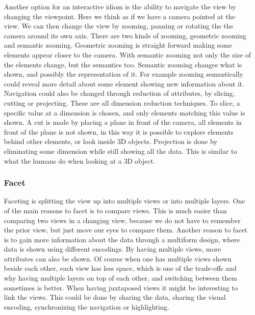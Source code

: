 \documentclass[Report.tex]{subfiles}
\begin{document}
Another option for an interactive idiom is the ability to navigate the view by changing the viewpoint. Here we think as if we have a camera pointed at the view. We can then change the view by zooming, panning or rotating the the camera around its own axis. There are two kinds of zooming, geometric zooming and semantic zooming. Geometric zooming is straight forward making some elements appear closer to the camera. With semantic zooming not only the size of the elements change, but the semantics too. Semantic zooming changes what is shown, and possibly the representation of it. For example zooming semantically could reveal more detail about some element showing new information about it.
Navigation could also be changed through reduction of attributes, by slicing, cutting or projecting. These are all dimension reduction techniques. To slice, a specific value at a dimension is chosen, and only elements matching this value is shown. A cut is made by placing a plane in front of the camera, all elements in front of the plane is not shown, in this way it is possible to explore elements behind other elements, or look inside 3D objects. Projection is done by eliminating some dimension while still showing all the data. This is similar to what the humans do when looking at a 3D object.
\subsubsection{Facet}
Faceting is splitting the view up into multiple views or into multiple layers. One of the main reasons to facet is to compare views. This is much easier than comparing two views in a changing view, because we do not have to remember the prior view, but just move our eyes to compare them. Another reason to facet is to gain more information about the data through a multiform design, where data is shown using different encodings. By having multiple views, more attributes can also be shown. Of course when one has multiple views shown beside each other, each view has less space, which is one of the trade-offs and why having multiple layers on top of each other, and switching between them sometimes is better. When having juxtaposed views it might be interesting to link the views.  This could be done by sharing the data, sharing the visual encoding, synchronizing the navigation or highlighting. 
\end{document}
